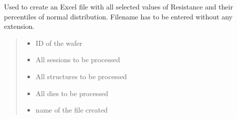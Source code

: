 \documentclass[letterpaper,10pt,english]{sphinxmanual}
\begin{document}
\begin{fulllineitems}
\label{\detokenize{excel:excel.excel_normal_R}}
\pysigstartsignatures
{}
\pysigstopsignatures
\sphinxAtStartPar
Used to create an Excel file with all selected values of Resistance and their percentiles of normal distribution.
Filename has to be entered without any extension.
\begin{quote}\begin{description}
\begin{itemize}
\item {} 
\sphinxAtStartPar
{} \textendash{} ID of the wafer

\item {} 
\sphinxAtStartPar
{} \textendash{} All sessions to be processed

\item {} 
\sphinxAtStartPar
{} \textendash{} All structures to be processed

\item {} 
\sphinxAtStartPar
{} \textendash{} All dies to be processed

\item {} 
\sphinxAtStartPar
{} \textendash{} name of the file created

\end{itemize}

\end{description}\end{quote}

\end{fulllineitems}

\end{document}
